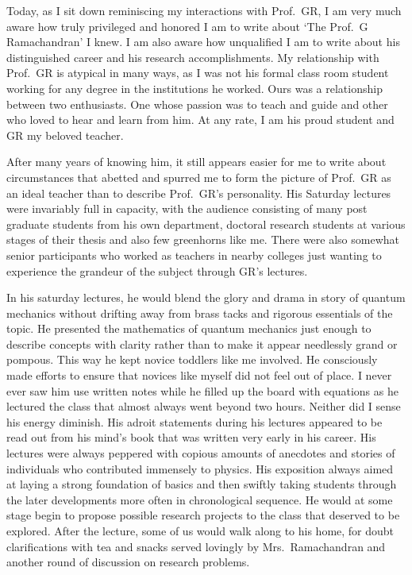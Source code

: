 Today, as I sit down reminiscing my interactions with Prof.\ GR, I am very much
aware how truly privileged and honored I am to write about `The Prof.\ G
Ramachandran' I knew. I am also aware how unqualified I am to write about his
distinguished career and his research accomplishments. My relationship with Prof.\ 
GR is atypical in many ways, as I was not his formal class room student working
for any degree in the institutions he worked. Ours was a relationship between two
enthusiasts. One whose passion was to teach and guide and other who loved to
hear and learn from him. At any rate, I am his proud student and GR my beloved
teacher.

After many years of knowing him, it still appears easier for me to write about
circumstances that abetted and spurred me to form the picture of Prof.\ GR as an
ideal teacher than to describe Prof.\ GR's personality. His Saturday lectures were
invariably full in capacity, with the audience consisting of many post graduate
students from his own department, doctoral research students at various stages of
their thesis and also few greenhorns like me. There were also somewhat senior
participants who worked as teachers in nearby colleges just wanting to experience
the grandeur of the subject through GR's lectures.

In his saturday lectures, he would blend the glory and drama in story of quantum
mechanics without drifting away from brass tacks and rigorous essentials of the
topic. He presented the mathematics of quantum mechanics just enough to
describe concepts with clarity rather than to make it appear needlessly grand or
pompous. This way he kept novice toddlers like me involved. He consciously
made efforts to ensure that novices like myself did not feel out of place. I never
ever saw him use written notes while he filled up the board with equations as he
lectured the class that almost always went beyond two hours. Neither did I sense
his energy diminish. His adroit statements during his lectures appeared to be read
out from his mind's book that was written very early in his career. His lectures
were always peppered with copious amounts of anecdotes and stories of
individuals who contributed immensely to physics. His exposition always aimed
at laying a strong foundation of basics and then swiftly taking students through
the later developments more often in chronological sequence. He would at some
stage begin to propose possible research projects to the class that deserved to be
explored. After the lecture, some of us would walk along to his home, for doubt
clarifications with tea and snacks served lovingly by Mrs.\ Ramachandran and
another round of discussion on research problems.

